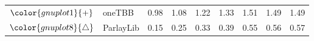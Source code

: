 \begin{tabular}{clrrrrrrr}
\rowcolor{gnuplot1!10}$\color{gnuplot1}{+}$ & oneTBB & \cellcolor{gnuplot1!10} 0.98 & \cellcolor{gnuplot1!10} 1.08 & \cellcolor{gnuplot1!10} 1.22 & \cellcolor{gnuplot1!10} 1.33 & \cellcolor{gnuplot1!10} 1.51 & \cellcolor{gnuplot1!10} 1.49 & \cellcolor{gnuplot1!10} 1.49 \\
\rowcolor{gnuplot8!10}$\color{gnuplot8}{\triangle}$ & ParlayLib & \cellcolor{gnuplot8!10} 0.15 & \cellcolor{gnuplot8!10} 0.25 & \cellcolor{gnuplot8!10} 0.33 & \cellcolor{gnuplot8!10} 0.39 & \cellcolor{gnuplot8!10} 0.55 & \cellcolor{gnuplot8!10} 0.56 & \cellcolor{gnuplot8!10} 0.57 \\
\bottomrule
\end{tabular}
